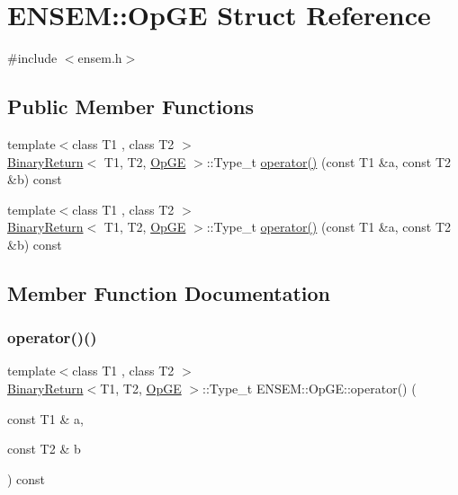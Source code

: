 \hypertarget{structENSEM_1_1OpGE}{}\section{E\+N\+S\+EM\+:\+:Op\+GE Struct Reference}
\label{structENSEM_1_1OpGE}


{\ttfamily \#include $<$ensem.\+h$>$}

\subsection*{Public Member Functions}
\begin{DoxyCompactItemize}
\item 
{\footnotesize template$<$class T1 , class T2 $>$ }\\\mbox{\hyperlink{structENSEM_1_1BinaryReturn}{Binary\+Return}}$<$ T1, T2, \mbox{\hyperlink{structENSEM_1_1OpGE}{Op\+GE}} $>$\+::Type\+\_\+t \mbox{\hyperlink{structENSEM_1_1OpGE_ab43afee7152159c15cf9af4203049d4b}{operator()}} (const T1 \&a, const T2 \&b) const
\item 
{\footnotesize template$<$class T1 , class T2 $>$ }\\\mbox{\hyperlink{structENSEM_1_1BinaryReturn}{Binary\+Return}}$<$ T1, T2, \mbox{\hyperlink{structENSEM_1_1OpGE}{Op\+GE}} $>$\+::Type\+\_\+t \mbox{\hyperlink{structENSEM_1_1OpGE_ab43afee7152159c15cf9af4203049d4b}{operator()}} (const T1 \&a, const T2 \&b) const
\end{DoxyCompactItemize}


\subsection{Member Function Documentation}
\mbox{\label{structENSEM_1_1OpGE_ab43afee7152159c15cf9af4203049d4b}} 
\subsubsection{\texorpdfstring{operator()()}{operator()()}\hspace{0.1cm}{\footnotesize\ttfamily [1/2]}}
{\footnotesize\ttfamily template$<$class T1 , class T2 $>$ \\
\mbox{\hyperlink{structENSEM_1_1BinaryReturn}{Binary\+Return}}$<$T1, T2, \mbox{\hyperlink{structENSEM_1_1OpGE}{Op\+GE}} $>$\+::Type\+\_\+t E\+N\+S\+E\+M\+::\+Op\+G\+E\+::operator() (\begin{DoxyParamCaption}\item[{const T1 \&}]{a,  }\item[{const T2 \&}]{b }\end{DoxyParamCaption}) const\hspace{0.3cm}{\ttfamily [inline]}}

